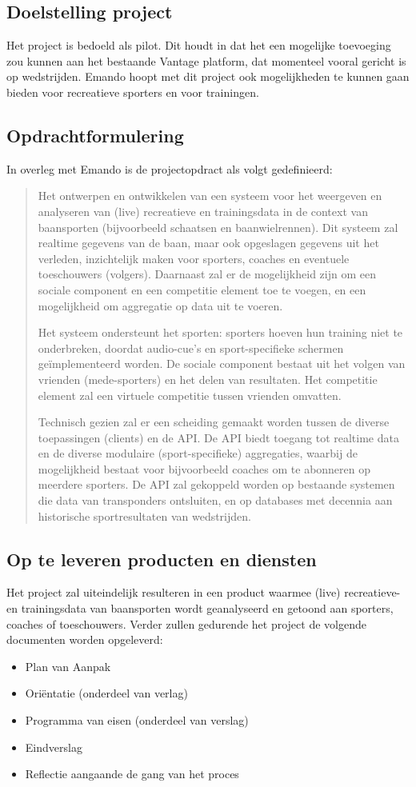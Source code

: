 \subsection{Doelstelling project}
Het project is bedoeld als pilot. Dit houdt in dat het een mogelijke toevoeging zou kunnen aan het bestaande Vantage platform, dat momenteel vooral gericht is op wedstrijden. Emando hoopt met dit project ook mogelijkheden te kunnen gaan bieden voor recreatieve sporters en voor trainingen.

\subsection{Opdrachtformulering}
In overleg met Emando is de projectopdract als volgt gedefinieerd:

\begin{quotation}
Het ontwerpen en ontwikkelen van een systeem voor het weergeven en analyseren van (live) recreatieve en trainingsdata in de context van baansporten (bijvoorbeeld schaatsen en baanwielrennen). Dit systeem zal realtime gegevens van de baan, maar ook opgeslagen gegevens uit het verleden, inzichtelijk maken voor sporters, coaches en eventuele toeschouwers (volgers). Daarnaast zal er de mogelijkheid zijn om een sociale component en een competitie element toe te voegen, en een mogelijkheid om aggregatie op data uit te voeren.

Het systeem ondersteunt het sporten: sporters hoeven hun training niet te onderbreken, doordat audio-cue's en sport-specifieke schermen geïmplementeerd worden. De sociale component bestaat uit het volgen van vrienden (mede-sporters) en het delen van resultaten. Het competitie element zal een virtuele competitie tussen vrienden omvatten.

Technisch gezien zal er een scheiding gemaakt worden tussen de diverse toepassingen (clients) en de API. De API biedt toegang tot realtime data en de diverse modulaire (sport-specifieke) aggregaties, waarbij de mogelijkheid bestaat voor bijvoorbeeld coaches om te abonneren op meerdere sporters. De API zal gekoppeld worden op bestaande systemen die data van transponders ontsluiten, en op databases met decennia aan historische sportresultaten van wedstrijden.
\end{quotation}

\subsection{Op te leveren producten en diensten}
Het project zal uiteindelijk resulteren in een product waarmee (live) recreatieve- en trainingsdata van baansporten wordt geanalyseerd en getoond aan sporters, coaches of toeschouwers. Verder zullen gedurende het project de volgende documenten worden opgeleverd: \begin{itemize}
\item Plan van Aanpak
\item Oriëntatie (onderdeel van verlag)
\item Programma van eisen (onderdeel van verslag)
\item Eindverslag
\item Reflectie aangaande de gang van het proces
\end{itemize}

